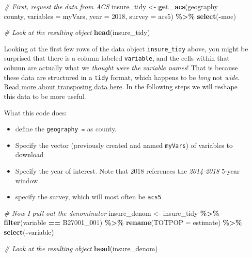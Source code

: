 \documentclass[
]{book}
\newenvironment{Shaded}{\begin{snugshade}}{\end{snugshade}}
\newcommand{\AttributeTok}[1]{\textcolor[rgb]{0.13,0.29,0.53}{#1}}
\newcommand{\CommentTok}[1]{\textcolor[rgb]{0.56,0.35,0.01}{\textit{#1}}}
\newcommand{\DecValTok}[1]{\textcolor[rgb]{0.00,0.00,0.81}{#1}}
\newcommand{\FunctionTok}[1]{\textcolor[rgb]{0.13,0.29,0.53}{\textbf{#1}}}
\newcommand{\NormalTok}[1]{#1}
\newcommand{\OtherTok}[1]{\textcolor[rgb]{0.56,0.35,0.01}{#1}}
\newcommand{\SpecialCharTok}[1]{\textcolor[rgb]{0.81,0.36,0.00}{\textbf{#1}}}
\newcommand{\StringTok}[1]{\textcolor[rgb]{0.31,0.60,0.02}{#1}}
\providecommand{\tightlist}{%
  \setlength{\itemsep}{0pt}\setlength{\parskip}{0pt}}
\newenvironment{rmdcaution}[1]
  {
  \begin{itemize}
  \renewcommand{\labelitemi}{
    \raisebox{-.7\height}[0pt][0pt]{
      {\setkeys{Gin}{width=3em,keepaspectratio}\texttt{[image: images/\#1]}}
    }
  }
  \setlength{\fboxsep}{1em}
  \begin{caution}
  \item
  }
  {
  \end{caution}
  \end{itemize}
  }
\begin{document}
\begin{Shaded}
\begin{Highlighting}[]
\CommentTok{\# First, request the data from ACS}
\NormalTok{insure\_tidy }\OtherTok{\textless{}{-}} \FunctionTok{get\_acs}\NormalTok{(}\AttributeTok{geography =} \StringTok{\textquotesingle{}county\textquotesingle{}}\NormalTok{,}
                     \AttributeTok{variables =}\NormalTok{ myVars,}
                     \AttributeTok{year =} \DecValTok{2018}\NormalTok{, }
                     \AttributeTok{survey =} \StringTok{\textquotesingle{}acs5\textquotesingle{}}\NormalTok{) }\SpecialCharTok{\%\textgreater{}\%}
  \FunctionTok{select}\NormalTok{(}\SpecialCharTok{{-}}\NormalTok{moe)}

\CommentTok{\# Look at the resulting object}
\FunctionTok{head}\NormalTok{(insure\_tidy)}
\end{Highlighting}
\end{Shaded}

\begin{rmdcaution}{caution}
Looking at the first few rows of the data object \texttt{insure\_tidy} above, you might be surprised that there is a column labeled \texttt{variable}, and the cells within that column are actually what we \emph{thought were the variable names}! That is because these data are structured in a \texttt{tidy} format, which happens to be \emph{long} not \emph{wide}. \protect\hyperlink{pivot_}{Read more about transposing data here}. In the following steps we will reshape this data to be more useful.

\end{rmdcaution}

What this code does:

\begin{itemize}
\tightlist
\item
  define the \texttt{geography\ =} as county.
\item
  Specify the vector (previously created and named \texttt{myVars}) of variables to download
\item
  Specify the year of interest. Note that 2018 references the \emph{2014-2018} 5-year window
\item
  specify the survey, which will most often be \texttt{acs5}
\end{itemize}

\begin{Shaded}
\begin{Highlighting}[]
\CommentTok{\# Now I pull out the denominator}
\NormalTok{insure\_denom }\OtherTok{\textless{}{-}}\NormalTok{ insure\_tidy }\SpecialCharTok{\%\textgreater{}\%}
  \FunctionTok{filter}\NormalTok{(variable }\SpecialCharTok{==} \StringTok{\textquotesingle{}B27001\_001\textquotesingle{}}\NormalTok{) }\SpecialCharTok{\%\textgreater{}\%}
  \FunctionTok{rename}\NormalTok{(}\AttributeTok{TOTPOP =}\NormalTok{ estimate) }\SpecialCharTok{\%\textgreater{}\%}
  \FunctionTok{select}\NormalTok{(}\SpecialCharTok{{-}}\NormalTok{variable)}

\CommentTok{\# Look at the resulting object}
\FunctionTok{head}\NormalTok{(insure\_denom)}
\end{Highlighting}
\end{Shaded}
\end{document}
